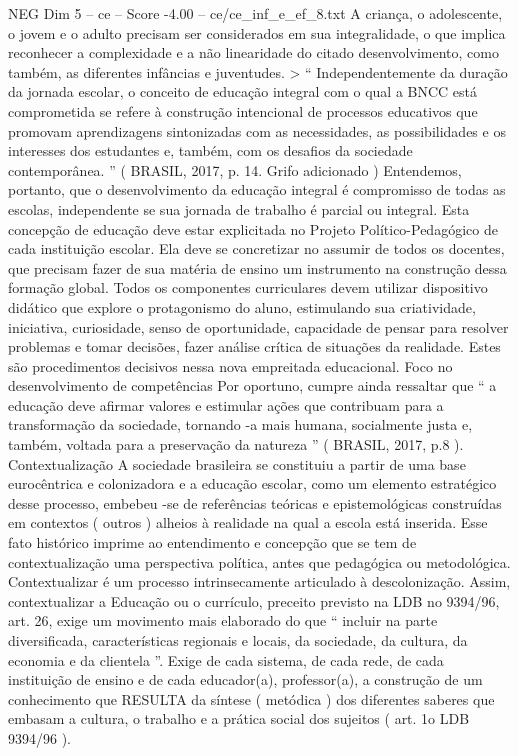 \begin{textsample}{NEG Dim 5 – ce – Score -4.00 – ce/ce\_inf\_e\_ef\_8.txt}
A criança, o adolescente, o jovem e o adulto precisam ser considerados em sua integralidade, o que implica reconhecer a complexidade e a não linearidade do citado desenvolvimento, como também, as diferentes infâncias e juventudes. > “ Independentemente da duração da jornada escolar, o conceito de educação integral com o qual a BNCC está comprometida se refere à construção intencional de processos educativos que promovam aprendizagens sintonizadas com as necessidades, as possibilidades e os interesses dos estudantes e, também, com os desafios da sociedade contemporânea. ” ( BRASIL, 2017, p. 14.
Grifo adicionado ) Entendemos, portanto, que o desenvolvimento da educação integral é compromisso de todas as escolas, independente se sua jornada de trabalho é parcial ou integral.
Esta concepção de educação deve estar explicitada no Projeto Político-Pedagógico de cada instituição escolar.
Ela deve se concretizar no assumir de todos os docentes, que precisam fazer de sua matéria de ensino um instrumento na construção dessa formação global.
Todos os componentes curriculares devem utilizar dispositivo didático que explore o protagonismo do aluno, estimulando sua criatividade, iniciativa, curiosidade, senso de oportunidade, capacidade de pensar para resolver problemas e tomar decisões, fazer análise crítica de situações da realidade.
Estes são procedimentos decisivos nessa nova empreitada educacional.
Foco no desenvolvimento de competências Por oportuno, cumpre ainda ressaltar que “ a educação deve afirmar valores e estimular ações que contribuam para a transformação da sociedade, tornando -a mais humana, socialmente justa e, também, voltada para a preservação da natureza ” ( BRASIL, 2017, p.8 ).
Contextualização A sociedade brasileira se constituiu a partir de uma base eurocêntrica e colonizadora e a educação escolar, como um elemento estratégico desse processo, embebeu -se de referências teóricas e epistemológicas construídas em contextos ( outros ) alheios à realidade na qual a escola está inserida.
Esse fato histórico imprime ao entendimento e concepção que se tem de contextualização uma perspectiva política, antes que pedagógica ou metodológica.
Contextualizar é um processo intrinsecamente articulado à descolonização.
Assim, contextualizar a Educação ou o currículo, preceito previsto na LDB no 9394/96, art. 26, exige um movimento mais elaborado do que “ incluir na parte diversificada, características regionais e locais, da sociedade, da cultura, da economia e da clientela ”.
Exige de cada sistema, de cada rede, de cada instituição de ensino e de cada educador(a), professor(a), a construção de um conhecimento que RESULTA da síntese ( metódica ) dos diferentes saberes que embasam a cultura, o trabalho e a prática social dos sujeitos ( art. 1o LDB 9394/96 ).

\end{textsample}
